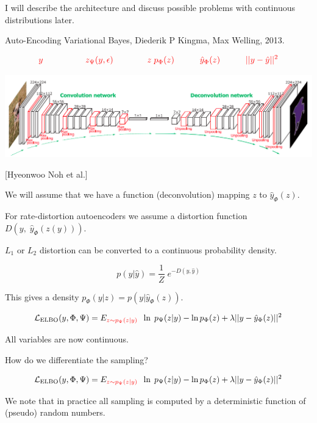 {\vfill
I will describe the architecture and discuss possible problems with continuous distributions later.


Auto-Encoding Variational Bayes, Diederik P Kingma, Max Welling, 2013.

\vfill
$${\color{red}y \hspace{5em}  z_\Psi(y,\epsilon) \hspace{4em} z\;p_\Phi(z) \hspace{3em} \hat{y}_\Phi(z) \hspace{3em}||y - \hat{y}||^2}$$
\centerline{\includegraphics[width=9in]{../images/Deconv}}

\centerline{\Large [Hyeonwoo Noh et al.]}


We will assume that we have a function (deconvolution) mapping $z$ to $\hat{y}_\Phi(z)$.

\vfill
For rate-distortion autoencoders we assume a distortion function $D(y,\;\hat{y}_\Phi(z(y)))$.

\vfill
$L_1$ or $L_2$ distortion can be converted to a continuous probability density.

\vfill
$$p(y|\hat{y}) = \frac{1}{Z} \; e^{- D(y,\hat{y})}$$

\vfill
This gives a density $p_\Phi(y|z) = p(y|\hat{y}_\Phi(z))$.

\bigskip
$${\cal L}_{\mathrm{ELBO}}(y,\Phi,\Psi)  = E_{\color{red} z \sim p_\Psi(z|y)}\;\;\ln\;p_\Psi(z|y) - \ln p_\Phi(z) + \lambda||y-\hat{y}_\Phi(z)||^2$$

\vfill
All variables are now continuous.

\vfill
How do we differentiate the sampling?

\vfill
{}
\bigskip
$${\cal L}_{\mathrm{ELBO}}(y,\Phi,\Psi)  = E_{\color{red} z \sim p_\Psi(z|y)}\;\;\ln\;p_\Psi(z|y) - \ln p_\Phi(z) + \lambda||y-\hat{y}_\Phi(z)||^2$$

\vfill
We note that in practice all sampling is computed by a deterministic function of (pseudo) random numbers.

}
